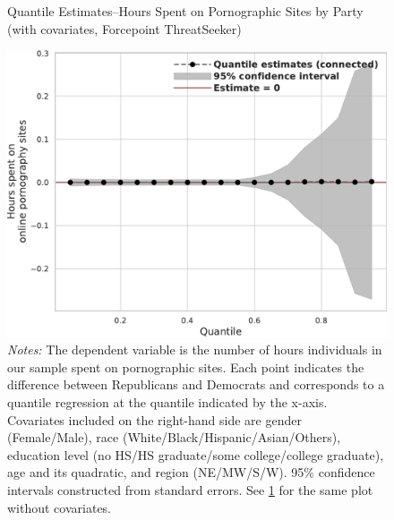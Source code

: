 \documentclass[12pt, letterpaper]{article}
\begin{document}
\begin{figure}[ht]
	\centering
	\caption{Quantile Estimates--Hours Spent on Pornographic Sites by Party (with covariates, Forcepoint ThreatSeeker)}
	\includegraphics[width=.55\linewidth]{figs/forcepoint_quantile_reg_covariates_duration_adult.pdf}
	\caption*{\footnotesize \emph{Notes:} 
		The dependent variable is the number of hours individuals in our sample spent on pornographic sites.
		Each point indicates the difference between Republicans and Democrats and corresponds to a quantile regression at the quantile indicated by the x-axis.
		Covariates included on the right-hand side are gender (Female/Male), race (White/Black/Hispanic/Asian/Others), education level (no HS/HS graduate/some college/college graduate), age and its quadratic, and region (NE/MW/S/W).
		95\% confidence intervals constructed from standard errors.
		See \cref{fig:forcepoint_quantile_regression_duration_covariates} for the same plot without covariates.
	}
	\label{fig:forcepoint_quantile_regression_duration_covariates}
\end{figure}





\FloatBarrier
\clearpage
\end{document}
